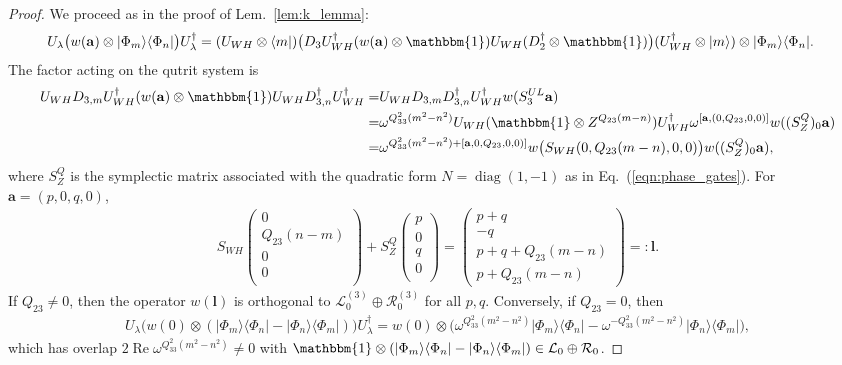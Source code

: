 \documentclass[aps,nofootinbib,floatfix,a4paper]{revtex4}
\renewcommand{\Re}{\operatorname{Re}}
\newcommand{\1}{\mbox{$\mathbf{1}$}}
\DeclareMathOperator{\diag}{diag}
\def\R{\mathcal{R}}
\def\Id{\mathbbm{1}}
\renewcommand{\vec}{\mathbf}
\begin{document}
\begin{proof}
	We proceed as in the proof of Lem.~\ref{lem:k_lemma}:
	\begin{align*}
		U_\lambda
		\big(
			w(\vec a)
			\otimes |\Phi_m\rangle\langle\Phi_n|
		\big)
		U_\lambda^\dagger
		&=
		(U_{WH}\otimes \langle m|) \big(
			D_3 U_{WH}^\dagger (w(\vec a) \otimes \Id) U_{WH} (D_2^\dagger\otimes \Id)
		\big)
		(U_{WH}^\dagger\otimes|m\rangle)
			\otimes |\Phi_m\rangle\langle\Phi_n|
			.
	\end{align*}
	The factor acting on the qutrit system is
	\begin{align*}
		U_{WH} D_{3,m} 
		U_{WH}^\dagger (w(\vec a) \otimes \Id) 
		U_{WH} D_{3,n}^\dagger U_{WH}^\dagger
		=&
		U_{WH} D_{3,m} D_{3,n}^\dagger U_{WH}^\dagger
		w(S_{3}^{UL}\vec a)
		\\
		=&
		\omega^{Q_{33}^2 (m^2-n^2)}
		U_{WH} 
		(\Id\otimes Z^{Q_{23}(m-n)})
		U_{WH}^\dagger
		\omega^{[\vec a, (0, Q_{23},0,0)]}
		w((S_{Z}^Q)_0\vec a)
		\\
		=&
		\omega^{Q_{33}^2 (m^2-n^2) + [\vec a, 0, Q_{23},0,0)]}
		w\big(S_{WH} ( 0, Q_{23}(m-n),0,0)\big) 
		w((S_{Z}^Q)_0\vec a)
		,
	\end{align*}
	where 
	$S^Q_Z$ is the symplectic matrix associated with the quadratic form 
	$N=\diag(1,-1)$ 
	as in Eq.~(\ref{eqn:phase_gates}).
	For $\vec a = (p,0,q,0)$,
	\begin{align*}
		S_{WH} 
		\begin{pmatrix}
			0\\
			Q_{23}(n-m)\\
			0\\
			0\\
		\end{pmatrix}
		+
		S^Q_Z
		\begin{pmatrix}
			p\\
			0\\
			q\\
			0\\
		\end{pmatrix}
		=
		\begin{pmatrix}
			p+q\\
			-q\\
			p+q+Q_{23}(m-n)\\
			p + Q_{23}(m-n)
		\end{pmatrix}
		=: \vec l.
	\end{align*}
	If $Q_{23}\neq 0$, then the operator $w(\vec l)$ is 
	orthogonal to $\mathcal{L}^{(3)}_0\oplus\R^{(3)}_0$ 
	for all $p,q$.
	Conversely, if $Q_{23}=0$, then
	\begin{align*}
		U_\lambda 
			\big(w(0) \otimes (|\Phi_m\rangle\langle\Phi_n| - |\Phi_n\rangle\langle\Phi_m|)\big)
		U_\lambda^\dagger
		=
		w(0)\otimes \big(
			\omega^{Q_{33}^2 (m^2-n^2) } 
			|\Phi_m\rangle\langle\Phi_n| 
			- 
			\omega^{-Q_{33}^2 (m^2-n^2) } 
			|\Phi_n\rangle\langle\Phi_m|
		\big),
	\end{align*}
	which has overlap $2\Re \omega^{Q_{33}^2 (m^2-n^2) }\neq 0$ with 
	$\Id\otimes ( |\Phi_m\rangle\langle\Phi_n| - |\Phi_n\rangle\langle\Phi_m| ) \in \mathcal{L}_0\oplus\mathcal{R}_0$.
\end{proof}
\end{document}
